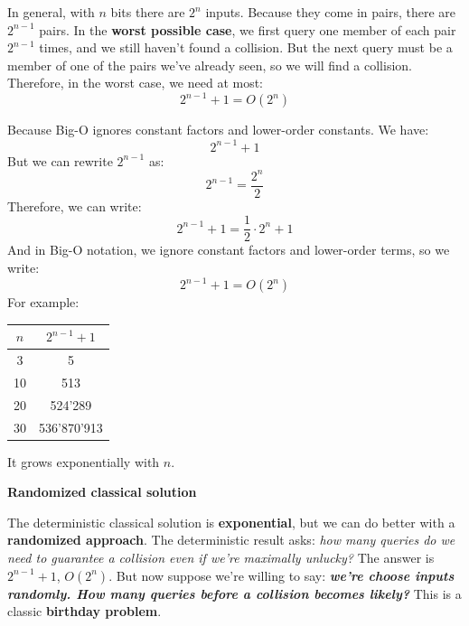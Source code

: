 \highspace
In general, with $n$ bits there are $2^{n}$ inputs. Because they come in pairs, there are $2^{n-1}$ pairs. In the \textbf{worst possible case}, we first query one member of each pair $2^{n-1}$ times, and we still haven't found a collision. But the next query must be a member of one of the pairs we've already seen, so we will find a collision. Therefore, in the worst case, we need at most:
\begin{equation}
    2^{n-1} + 1 = O(2^n)
\end{equation}
\begin{remarkbox}
    Because Big-O ignores constant factors and lower-order constants. We have:
    \begin{equation*}
        2^{n-1} + 1
    \end{equation*}
    But we can rewrite $2^{n-1}$ as:
    \begin{equation*}
        2^{n-1} = \frac{2^n}{2}
    \end{equation*}
    Therefore, we can write:
    \begin{equation*}
        2^{n-1} + 1 = \frac{1}{2} \cdot 2^n + 1
    \end{equation*}
    And in Big-O notation, we ignore constant factors and lower-order terms, so we write:
    \begin{equation*}
        2^{n-1} + 1 = O\left(2^n\right)
    \end{equation*}
    For example:
    \begin{center}
        \begin{tabular}{@{} c c @{}}
            \toprule
            $n$ & $2^{n-1} + 1$ \\
            \midrule
            3 & 5 \\
            10 & 513 \\
            20 & 524'289 \\
            30 & 536'870'913 \\
            \bottomrule
        \end{tabular}
    \end{center}
    It grows exponentially with $n$.
\end{remarkbox}

\begin{flushleft}
    \textcolor{Red2}{ \textbf{Randomized classical solution}}\label{sec:randomized-classical-solution-simons}
\end{flushleft}
The deterministic classical solution is \textbf{exponential}, but we can do better with a \textbf{randomized approach}. The deterministic result asks: \emph{how many queries do we need to guarantee a collision even if we're maximally unlucky?} The answer is $2^{n-1} + 1$, $O(2^n)$. But now suppose we're willing to say: \emph{\textbf{we're choose inputs randomly. How many queries before a collision becomes likely?}} This is a classic \textbf{birthday problem}.

